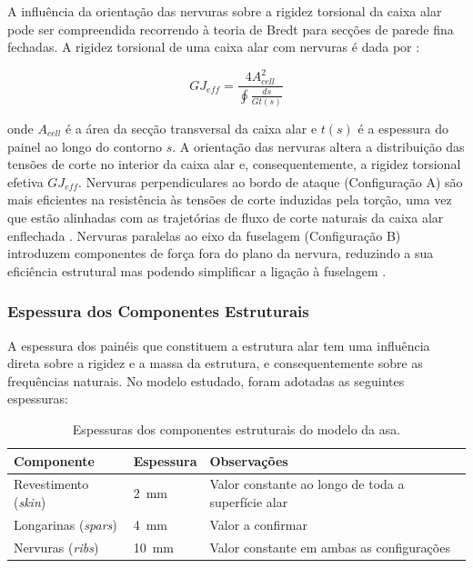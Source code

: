\documentclass[a4paper,fleqn,noprintline]{cas-dc}
\begin{document}
A influência da orientação das nervuras sobre a rigidez torsional da caixa alar pode ser compreendida recorrendo à teoria de Bredt para secções de parede fina fechadas. A rigidez torsional de uma caixa alar com nervuras é dada por \cite{Megson2012}:

\begin{equation}
    GJ_{eff} = \frac{4A_{cell}^2}{\oint \frac{ds}{Gt(s)}}
    \label{eq:bredt}
\end{equation}

\noindent onde $A_{cell}$ é a área da secção transversal da caixa alar e $t(s)$ é a espessura do painel ao longo do contorno $s$. A orientação das nervuras altera a distribuição das tensões de corte no interior da caixa alar e, consequentemente, a rigidez torsional efetiva $GJ_{eff}$. Nervuras perpendiculares ao bordo de ataque (Configuração A) são mais eficientes na resistência às tensões de corte induzidas pela torção, uma vez que estão alinhadas com as trajetórias de fluxo de corte naturais da caixa alar enflechada \cite{Niu1988, Megson2012}. Nervuras paralelas ao eixo da fuselagem (Configuração B) introduzem componentes de força fora do plano da nervura, reduzindo a sua eficiência estrutural mas podendo simplificar a ligação à fuselagem \cite{Raymer2018}.

\subsubsection{Espessura dos Componentes Estruturais}

A espessura dos painéis que constituem a estrutura alar tem uma influência direta sobre a rigidez e a massa da estrutura, e consequentemente sobre as frequências naturais. No modelo estudado, foram adotadas as seguintes espessuras:

\begin{table}[h!]
\centering
\caption{Espessuras dos componentes estruturais do modelo da asa.}
\label{tab:espessuras}
\renewcommand{\arraystretch}{1.4}
\begin{tabularx}{\textwidth}{p{4cm} p{3cm} X}
\toprule
\textbf{Componente} & \textbf{Espessura} & \textbf{Observações} \\
\midrule
Revestimento (\textit{skin})    & \SI{2}{\milli\meter}  & 
    Valor constante ao longo de toda a superfície alar \\
Longarinas (\textit{spars})     & \SI{4}{\milli\meter}  & 
    Valor a confirmar\footnotemark \\
Nervuras (\textit{ribs})        & \SI{10}{\milli\meter} & 
    Valor constante em ambas as configurações \\
\bottomrule
\end{tabularx}
\end{table}
\end{document}
